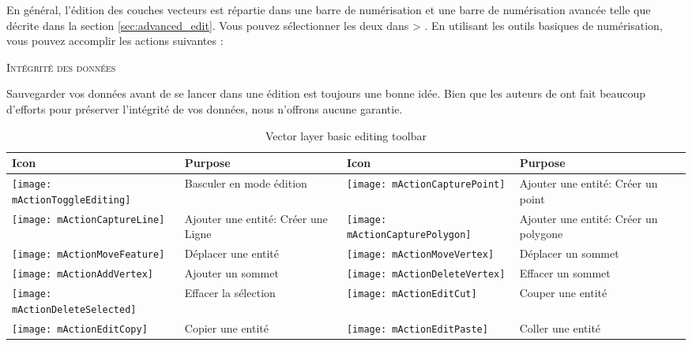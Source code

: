 
En général, l'édition des couches vecteurs est répartie dans une barre de numérisation et une barre de numérisation avancée telle que décrite dans la section \ref{sec:advanced_edit}. Vous pouvez sélectionner les deux dans  > . En utilisant les outils basiques de numérisation, vous pouvez accomplir les actions suivantes :

\begin{Tip}[ht]\caption{\textsc{Intégrité des données}}
Sauvegarder vos données avant de se lancer dans une édition est toujours une bonne idée. Bien que les auteurs de \qg ont fait beaucoup d'efforts pour préserver l'intégrité de vos données, nous n'offrons aucune garantie.
\end{Tip}
\begin{table}[ht]
\centering

\begin{tabular}{|l|p{5.5cm}|l|p{5.5cm}|}
\hline \textbf{Icon} & \textbf{Purpose} & \textbf{Icon} & \textbf{Purpose} \\
\hline \texttt{[image: mActionToggleEditing]}
   & Basculer en mode édition
   & \texttt{[image: mActionCapturePoint]}
   & Ajouter une entité: Créer un point \\
\hline \texttt{[image: mActionCaptureLine]}
   & Ajouter une entité: Créer une Ligne
   & \texttt{[image: mActionCapturePolygon]}
   & Ajouter une entité: Créer un polygone \\
\hline \texttt{[image: mActionMoveFeature]}
   & Déplacer une entité
   & \texttt{[image: mActionMoveVertex]}
   & Déplacer un sommet\\
\hline \texttt{[image: mActionAddVertex]}
   & Ajouter un sommet
   & \texttt{[image: mActionDeleteVertex]}
   & Effacer un sommet \\
\hline \texttt{[image: mActionDeleteSelected]}
   & Effacer la sélection
   & \texttt{[image: mActionEditCut]}
   & Couper une entité \\
\hline \texttt{[image: mActionEditCopy]}
   & Copier une entité 
   & \texttt{[image: mActionEditPaste]} 
   & Coller une entité \\
\hline
\end{tabular}
\caption{Vector layer basic editing toolbar}\label{tab:vector_editing}
\end{table}

